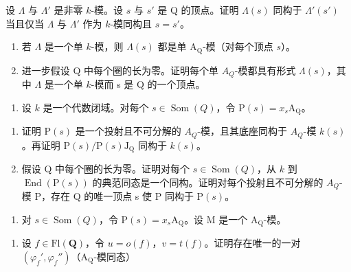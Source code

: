 设 \(\Lambda\) 与 \(\Lambda'\) 是非零 \(k\)-模。设 \(s\) 与 \(s'\) 是 Q 的顶点。证明 \(\Lambda(s)\) 同构于 \(\Lambda'(s')\) 当且仅当 \(\Lambda\) 与 \(\Lambda'\) 作为 \(k\)-模同构且 \(s = s'\)。

\begin{enumerate}
\def\labelenumi{\alph{enumi})}
\setcounter{enumi}{2}
\item
  若 \(\Lambda\) 是一个单 \(k\)-模，则 \(\Lambda(s)\) 都是单 \(\mathrm{A}_{\mathrm{Q}}\)-模（对每个顶点 \(s\)）。
\item
  进一步假设 Q 中每个圈的长为零。证明每个单 \(A_Q\)-模都具有形式 \(\Lambda(s)\)，其中 \(\Lambda\) 是一个单 \(k\)-模而 s 是 Q 的一个顶点。
\end{enumerate}

\begin{enumerate}
\def\labelenumi{\arabic{enumi})}
\setcounter{enumi}{6}
\tightlist
\item
  设 \(k\) 是一个代数闭域。对每个 \(s \in \operatorname{Som}(Q)\)，令 \(\mathrm{P}(s) = x_s\mathrm{A}_{\mathrm{Q}}\)。
\end{enumerate}

\begin{enumerate}
\def\labelenumi{\alph{enumi})}
\item
  证明 \(\mathrm{P}(s)\) 是一个投射且不可分解的 \(A_{Q}\)-模，且其底座同构于 \(A_{Q}\)-模 \(k(s)\)。再证明 \(\mathrm{P}(s)/\mathrm{P}(s)\mathrm{J}_{\mathrm{Q}}\) 同构于 \(k(s)\)。
\item
  假设 Q 中每个圈的长为零。证明对每个 \(s \in \operatorname{Som}(Q)\)，从 \(k\) 到 \(\operatorname{End}(\mathrm{P}(s))\) 的典范同态是一个同构。证明对每个投射且不可分解的 \(A_Q\)-模 P，存在 Q 的唯一顶点 s 使 P 同构于 \(\mathrm{P}(s)\)。
\end{enumerate}

\begin{enumerate}
\def\labelenumi{\arabic{enumi})}
\setcounter{enumi}{7}
\tightlist
\item
  对 \(s \in \operatorname{Som}(Q)\)，令 \(\mathrm{P}(s) = x_s\mathrm{A}_{\mathrm{Q}}\)。设 M 是一个 \(\mathrm{A}_{\mathrm{Q}}\)-模。
\end{enumerate}

\begin{enumerate}
\def\labelenumi{\alph{enumi})}
\tightlist
\item
  设 \(f \in \mathrm{Fl}(\mathbf{Q})\)，令 \(u = o(f)\)，\(v = t(f)\)。证明存在唯一的一对 \((\varphi_f', \varphi_f'')\)（\(\mathrm{A}_{\mathrm{Q}}\)-模同态）
\end{enumerate}

